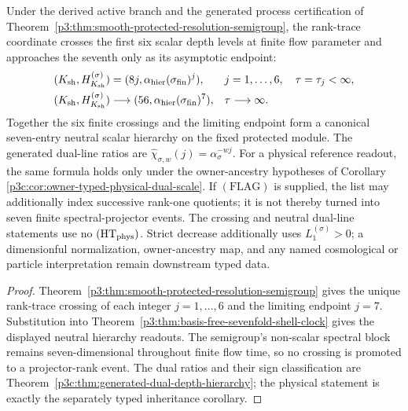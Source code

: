 \documentclass[12pt,a4paper]{article}
\begin{document}
\begin{corollary}
\label{p3:cor:protected-spectral-resolution-landmarks}
Under the derived active branch and the generated process certification of
Theorem~\ref{p3:thm:smooth-protected-resolution-semigroup}, the
rank-trace coordinate crosses the first six scalar depth levels at finite
flow parameter and approaches the seventh only
as its asymptotic endpoint:
\begin{equation}
\label{p3:eq:protected-resolution-landmark-ledger}
 \begin{aligned}
  (K_{\mathrm{sh}},H_{K_{\mathrm{sh}}}^{(\sigma)})
   &=(8j,\alpha_{\rm hier}(\sigma_{\rm fin})^{j}),
     &&j=1,\ldots,6,
       \quad \tau=\tau_j<\infty,\\
  (K_{\mathrm{sh}},H_{K_{\mathrm{sh}}}^{(\sigma)})
   &\longrightarrow(56,\alpha_{\rm hier}(\sigma_{\rm fin})^{7}),
     &&\tau\longrightarrow\infty.
 \end{aligned}
\end{equation}
Together the six finite crossings and the limiting endpoint form a canonical
seven-entry neutral scalar hierarchy on the fixed protected module.  The
generated dual-line ratios are \(\widehat\chi_{\sigma,w}(j)=\alpha_\sigma^{-wj}\).
For a physical reference readout, the same formula holds only under the
owner-ancestry hypotheses of Corollary~
\ref{p3c:cor:owner-typed-physical-dual-scale}.  If
\((\mathrm{FLAG})\) is supplied, the list may additionally index successive
rank-one quotients; it is not thereby turned into seven finite
spectral-projector events.  The crossing and neutral dual-line statements use
no \((\mathrm{HT}_{\rm phys})\).  Strict decrease additionally uses
\(L_1^{(\sigma)}>0\); a dimensionful normalization, owner-ancestry map, and
any named cosmological or particle interpretation remain downstream typed
data.
\end{corollary}

\begin{proof}
Theorem~\ref{p3:thm:smooth-protected-resolution-semigroup} gives the unique
rank-trace crossing of each integer \(j=1,\ldots,6\) and the limiting endpoint
\(j=7\).  Substitution into
Theorem~\ref{p3:thm:basis-free-sevenfold-shell-clock} gives the displayed
neutral hierarchy readouts.  The semigroup's non-scalar spectral block
remains seven-dimensional throughout finite flow time, so no crossing is
promoted to a projector-rank event.  The dual ratios and their sign
classification are Theorem~\ref{p3c:thm:generated-dual-depth-hierarchy}; the
physical statement is exactly the separately typed inheritance corollary.
\end{proof}
\end{document}
